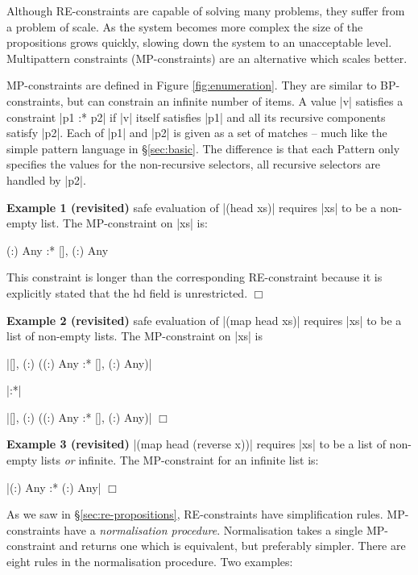 \documentclass[preprint]{sigplanconf}
\newcommand{\C}[1]{\textsf{#1}}
\newcommand{\noexample}{\hfill$\Box$\par\addvspace{2mm}}
\newenvironment{revisit}[1]
    {\addvspace{2mm}\noindent\textbf{Example #1 (revisited)}}
    {\noexample}
\begin{document}
Although RE-constraints are capable of solving many problems, they suffer from a problem of scale. As the system becomes more complex the size of the propositions grows quickly, slowing down the system to an unacceptable level. Multipattern constraints (MP-constraints) are an alternative which scales better.

MP-constraints are defined in Figure \ref{fig:enumeration}. They are similar to BP-constraints, but can constrain an infinite number of items. A value |v| satisfies a constraint |p1 :* p2| if |v| itself satisfies |p1| and all its recursive components satisfy |p2|. Each of |p1| and |p2| is given as a set of matches -- much like the simple pattern language in \S\ref{sec:basic}. The difference is that each \C{Pattern} only specifies the values for the non-recursive selectors, all recursive selectors are handled by |p2|.

\begin{revisit}{1} safe evaluation of |(head xs)| requires |xs| to be a non-empty list. The MP-constraint on |xs| is:

\begin{code}
{(:) Any} :* {[], (:) Any}
\end{code}

This constraint is longer than the corresponding RE-constraint because it is explicitly stated that the \C{hd} field is unrestricted.
\end{revisit}

\begin{revisit}{2} safe evaluation of |(map head xs)| requires |xs| to be a list of non-empty lists. The MP-constraint on |xs| is

\smallskip
\par\noindent |{[], (:) ({(:) Any} :* {[], (:) Any})}|
\par\noindent |:*|
\par\noindent |{[], (:) ({(:) Any} :* {[], (:) Any})}|
\end{revisit}

\begin{revisit}{3} |(map head (reverse x))| requires |xs| to be a list of non-empty lists \textit{or} infinite. The MP-constraint for an infinite list is:

\smallskip\noindent |{(:) Any} :* {(:) Any}|
\end{revisit}

As we saw in \S\ref{sec:re-propositions}, RE-constraints have simplification rules.  MP-constraints have a \textit{normalisation procedure}. Normalisation takes a single MP-constraint and returns one which is equivalent, but preferably simpler. There are eight rules in the normalisation procedure. Two examples:
\end{document}
